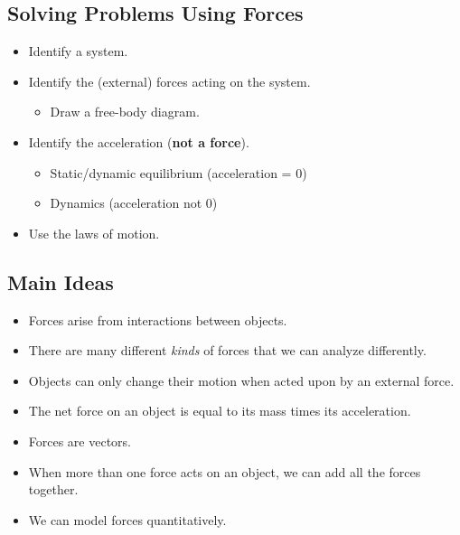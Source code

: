 \documentclass[]{article}
\begin{document}
\begin{PresentSpace}
\vspace{-10pt}
\section*{Solving Problems Using Forces}
\vspace{-10pt}
\begin{itemize}
	\item Identify a system.
	\item Identify the (external) forces acting on the system.
	\begin{itemize}
		\item Draw a free-body diagram.
	\end{itemize}
	\item Identify the acceleration (\textbf{not a force}).
	\begin{itemize}
		\item Static/dynamic equilibrium (acceleration = 0)
		\item Dynamics (acceleration not 0)
	\end{itemize}
	\item Use the laws of motion.
\end{itemize}
\end{PresentSpace}
\newpage
\begin{TeacherMargin}

\end{TeacherMargin}
\begin{PresentSpace}
\section*{Main Ideas}
\begin{itemize}
	\item Forces arise from interactions between objects.
	\item There are many different \textit{kinds} of forces that we can analyze differently.
	\item Objects can only change their motion when acted upon by an external force.
	\item The net force on an object is equal to its mass times its acceleration.
	\item Forces are vectors.
	\item When more than one force acts on an object, we can add all the forces together.
	\item We can model forces quantitatively.
\end{itemize}
\end{PresentSpace}
\end{document}
